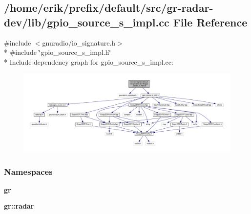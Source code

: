 \subsection{/home/erik/prefix/default/src/gr-\/radar-\/dev/lib/gpio\+\_\+source\+\_\+s\+\_\+impl.cc File Reference}
\label{gpio__source__s__impl_8cc}
{\ttfamily \#include $<$gnuradio/io\+\_\+signature.\+h$>$}\\*
{\ttfamily \#include \char`\"{}gpio\+\_\+source\+\_\+s\+\_\+impl.\+h\char`\"{}}\\*
Include dependency graph for gpio\+\_\+source\+\_\+s\+\_\+impl.\+cc\+:
\nopagebreak
\begin{figure}[H]
\begin{center}
\leavevmode
\includegraphics[width=350pt]{df/de9/gpio__source__s__impl_8cc__incl}
\end{center}
\end{figure}
\subsubsection*{Namespaces}
\begin{DoxyCompactItemize}
\item 
 {\bf gr}
\item 
 {\bf gr\+::radar}
\end{DoxyCompactItemize}
